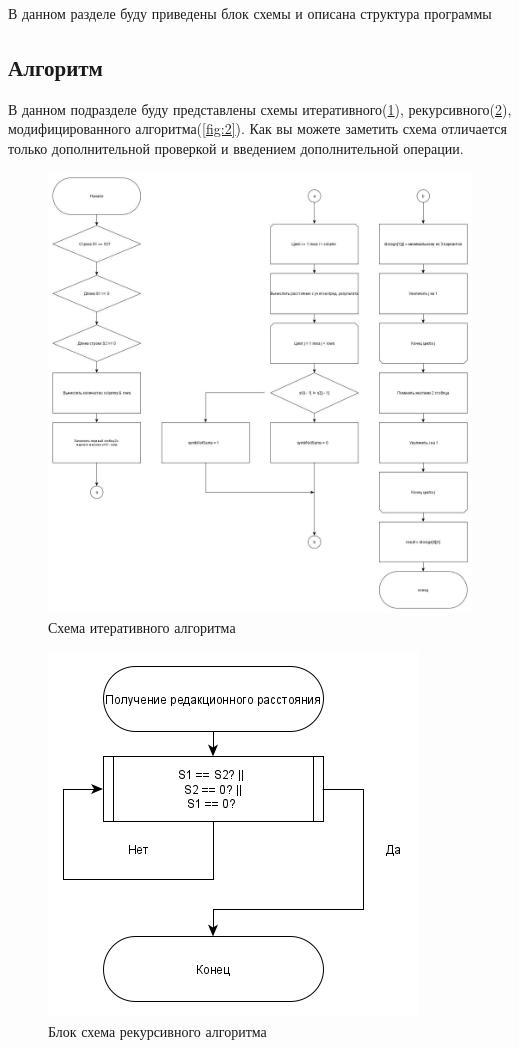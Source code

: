 \documentclass[a4paper, 14pt]{article}
\begin{document}
	В данном разделе буду приведены блок схемы и описана структура программы
	
	\subsection{Алгоритм}
	
	В данном подразделе буду представлены схемы итеративного(\ref{fig:unnamed1}), рекурсивного(\ref{fig:1}), модифицированного алгоритма(\ref{fig:2}). Как вы можете заметить схема отличается только дополнительной проверкой и введением дополнительной операции.
	
	
	\begin{figure}[!h]
		\centering
		\includegraphics[width=0.7\linewidth]{img/unnamed1}
		\caption{Схема итеративного алгоритма}
		\label{fig:unnamed1}
	\end{figure}
	
	\newpage
	\begin{figure}[!h]
		\centering
		\includegraphics[scale=0.5]{img/1}
		\caption{Блок схема рекурсивного алгоритма}
		\label{fig:1}
	\end{figure}
\end{document}
